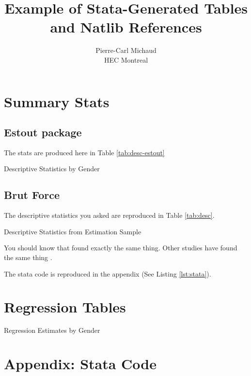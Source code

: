 \documentclass[11pt, oneside]{article}   	%
\title{Example of Stata-Generated Tables and Natlib References}
\author{Pierre-Carl Michaud \\ HEC Montreal}
\begin{document}
\maketitle

\section{Summary Stats}

\subsection{Estout package}

The stats are produced here in Table \ref{tab:desc-estout}

\begin{table}[htp]
  \centering
  
  \caption{Descriptive Statistics by Gender}
  \label{tab:desc-estout}
\end{table}

\subsection{Brut Force}
The descriptive statistics you asked are reproduced in Table \ref{tab:desc}. 

\begin{table}[htp]
\centering

\caption{Descriptive Statistics from Estimation Sample}
\label{tab:desc}
\end{table}

You should know that \citep{lusardi_financial_2011} found exactly the same thing. Other studies have found the same thing \citet{lusardi_financial_2011}.


The stata code is reproduced in the appendix (See Listing \ref{lst:stata}). 

\section{Regression Tables}

\begin{table}[htp]
  \centering
  
  \caption{Regression Estimates by Gender}
  \label{tab:reg-gender}
\end{table}




\newpage

\appendix

\section*{Appendix: Stata Code}

\end{document}
